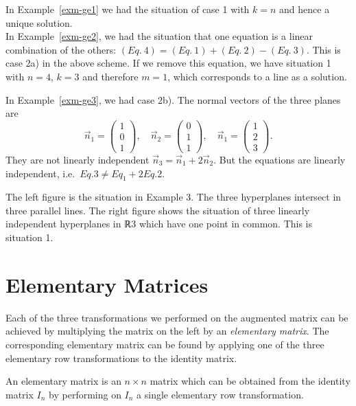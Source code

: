 \documentclass[
  a4paper,
  DIV=11,
  numbers=noendperiod,
  oneside]{scrreprt}
\theoremstyle{definition}
\theoremstyle{remark}
\newenvironment{fbxSimple}[3]{\begin{tcolorbox}[enhanced, breakable,%
attach boxed title to top*={xshift=1.4pt},
boxed title style={boxrule=0.0mm, fuzzy shadow={1pt}{-1pt}{0mm}{0.1mm}{gray}, arc=.3em, rounded corners=east, sharp corners=west}, colframe=#1-color2, colbacktitle=#1-color1, colback = white, coltitle=black,  titlerule=0mm, toprule=0pt, bottomrule=.7pt, leftrule=.3em, rightrule=.7pt, outer arc=.3em,  	left=.5em, right=.5em, bottomtitle=1mm, toptitle=1mm,title=\textbf{#2}\hspace{0.5em}{#3}]}
{\end{tcolorbox}}
\begin{document}
In Example~\ref{exm-ge1} we had the situation of case 1 with \(k=n\) and
hence a unique solution.\\
In Example~\ref{exm-ge2}, we had the situation that one equation is a
linear combination of the others:
\((Eq.~4) = (Eq.~1)+(Eq.~2) - (Eq.~3)\). This is case 2a) in the above
scheme. If we remove this equation, we have situation 1 with \(n=4\),
\(k=3\) and therefore \(m=1\), which corresponds to a line as a
solution.

In Example~\ref{exm-ge3}, we had case 2b). The normal vectors of the
three planes are
\[\vec{n}_{1} = \scriptscriptstyle \begin{pmatrix}   1 \\ 0 \\ 1  \end{pmatrix} \textstyle, \quad \vec{n}_{2} = \scriptscriptstyle \begin{pmatrix}   0 \\ 1 \\ 1  \end{pmatrix} \textstyle, \quad \vec{n}_{1} = \scriptscriptstyle \begin{pmatrix}   1 \\ 2 \\ 3  \end{pmatrix} \textstyle .\]
They are not linearly independent
\(\vec{n}_{3} = \vec{n}_{1} +2 \vec{n}_{2}\). But the equations are
linearly independent, i.e.~\(Eq. 3 \neq Eq_{1} + 2 Eq. 2\).

The left figure is the situation in Example 3. The three hyperplanes
intersect in three parallel lines. The right figure shows the situation
of three linearly independent hyperplanes in {ℝ3} which have one point
in common. This is situation 1.

\section{Elementary Matrices}\label{elementary-matrices}

Each of the three transformations we performed on the augmented matrix
can be achieved by multiplying the matrix on the left by an
\emph{elementary matrix}. The corresponding elementary matrix can be
found by applying one of the three elementary row transformations to the
identity matrix.

\label{Definition-3.11}
\begin{fbxSimple}{Definition}{Definition 3.11}{}
\label{Definition-3.11}
An elementary matrix is an \(n\times n\) matrix which can be obtained
from the identity matrix \(I_{n}\) by performing on \(I_{n}\) a single
elementary row transformation.

\end{fbxSimple}
\end{document}

